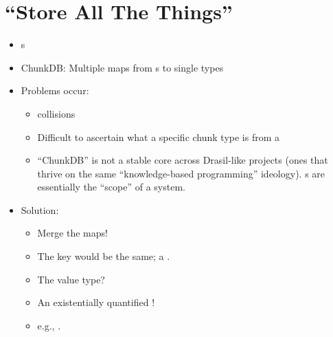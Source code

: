 \chapter{``Store All The Things''}
\label{chap:storingChunks}


\begin{itemize}

      \item \UID{}s

      \item ChunkDB: Multiple maps from \UID{}s to single types

      \item Problems occur:
            \begin{itemize}

                  \item \UID{} collisions

                  \item Difficult to ascertain what a specific chunk type is
                        from a \UID{}

                  \item ``ChunkDB'' is not a stable core across Drasil-like
                        projects (ones that thrive on the same ``knowledge-based
                        programming'' ideology). \ChunkDB{}s are essentially the
                        ``scope'' of a system.

            \end{itemize}

      \item Solution:
            \begin{itemize}

                  \item Merge the maps!

                  \item The key would be the same; a \UID{}.

                  \item The value type?

                  \item An existentially quantified !

                  \item e.g., .

            \end{itemize}


\end{itemize}
